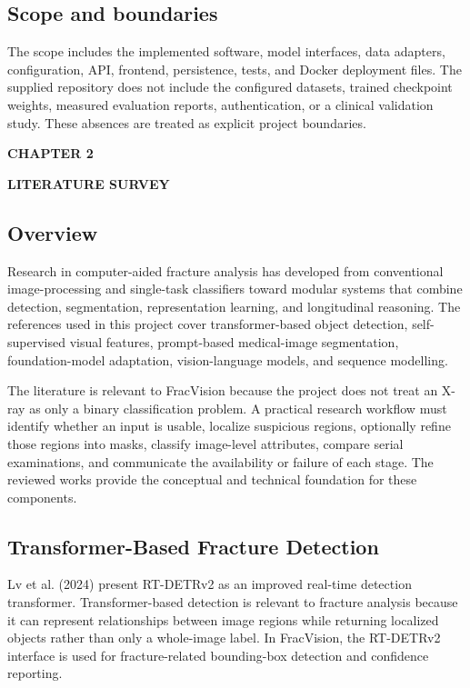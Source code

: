 \documentclass[12pt,a4paper]{article}
\begin{document}
\subsection{Scope and boundaries}
The scope includes the implemented software, model interfaces, data adapters, configuration, API, frontend, persistence, tests, and Docker deployment files. The supplied repository does not include the configured datasets, trained checkpoint weights, measured evaluation reports, authentication, or a clinical validation study. These absences are treated as explicit project boundaries.

\clearpage
{}
\begin{center}
  {\fontsize{13.2pt}{16pt}\selectfont\bfseries CHAPTER 2\par}
  \vspace{4pt}
  {\fontsize{13.2pt}{16pt}\selectfont\bfseries LITERATURE SURVEY\par}
\end{center}
\vspace{12pt}

\subsection{Overview}
Research in computer-aided fracture analysis has developed from conventional image-processing and single-task classifiers toward modular systems that combine detection, segmentation, representation learning, and longitudinal reasoning. The references used in this project cover transformer-based object detection, self-supervised visual features, prompt-based medical-image segmentation, foundation-model adaptation, vision-language models, and sequence modelling.

The literature is relevant to FracVision because the project does not treat an X-ray as only a binary classification problem. A practical research workflow must identify whether an input is usable, localize suspicious regions, optionally refine those regions into masks, classify image-level attributes, compare serial examinations, and communicate the availability or failure of each stage. The reviewed works provide the conceptual and technical foundation for these components.

\subsection{Transformer-Based Fracture Detection}
Lv et al. (2024) present RT-DETRv2 as an improved real-time detection transformer. Transformer-based detection is relevant to fracture analysis because it can represent relationships between image regions while returning localized objects rather than only a whole-image label. In FracVision, the RT-DETRv2 interface is used for fracture-related bounding-box detection and confidence reporting.
\end{document}
